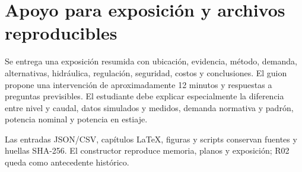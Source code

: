 \section{Apoyo para exposición y archivos reproducibles}
Se entrega una exposición resumida con ubicación, evidencia, método, demanda, alternativas, hidráulica, regulación, seguridad, costos y conclusiones. El guion propone una intervención de aproximadamente 12 minutos y respuestas a preguntas previsibles. El estudiante debe explicar especialmente la diferencia entre nivel y caudal, datos simulados y medidos, demanda normativa y padrón, potencia nominal y potencia en estiaje.

Las entradas JSON/CSV, capítulos LaTeX, figuras y scripts conservan fuentes y huellas SHA-256. El constructor reproduce memoria, planos y exposición; R02 queda como antecedente histórico.
